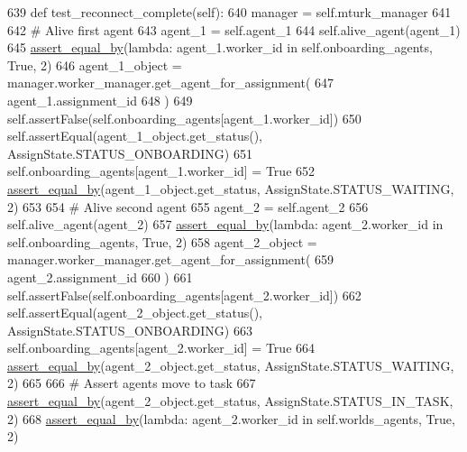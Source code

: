 \begin{DoxyCode}
639     \textcolor{keyword}{def }test\_reconnect\_complete(self):
640         manager = self.mturk\_manager
641 
642         \textcolor{comment}{# Alive first agent}
643         agent\_1 = self.agent\_1
644         self.alive\_agent(agent\_1)
645         \hyperlink{namespaceparlai_1_1mturk_1_1core_1_1test_1_1test__full__system_a0b463246d35658a2e422010f13dcf819}{assert\_equal\_by}(\textcolor{keyword}{lambda}: agent\_1.worker\_id \textcolor{keywordflow}{in} self.onboarding\_agents, \textcolor{keyword}{True}, 2)
646         agent\_1\_object = manager.worker\_manager.get\_agent\_for\_assignment(
647             agent\_1.assignment\_id
648         )
649         self.assertFalse(self.onboarding\_agents[agent\_1.worker\_id])
650         self.assertEqual(agent\_1\_object.get\_status(), AssignState.STATUS\_ONBOARDING)
651         self.onboarding\_agents[agent\_1.worker\_id] = \textcolor{keyword}{True}
652         \hyperlink{namespaceparlai_1_1mturk_1_1core_1_1test_1_1test__full__system_a0b463246d35658a2e422010f13dcf819}{assert\_equal\_by}(agent\_1\_object.get\_status, AssignState.STATUS\_WAITING, 2)
653 
654         \textcolor{comment}{# Alive second agent}
655         agent\_2 = self.agent\_2
656         self.alive\_agent(agent\_2)
657         \hyperlink{namespaceparlai_1_1mturk_1_1core_1_1test_1_1test__full__system_a0b463246d35658a2e422010f13dcf819}{assert\_equal\_by}(\textcolor{keyword}{lambda}: agent\_2.worker\_id \textcolor{keywordflow}{in} self.onboarding\_agents, \textcolor{keyword}{True}, 2)
658         agent\_2\_object = manager.worker\_manager.get\_agent\_for\_assignment(
659             agent\_2.assignment\_id
660         )
661         self.assertFalse(self.onboarding\_agents[agent\_2.worker\_id])
662         self.assertEqual(agent\_2\_object.get\_status(), AssignState.STATUS\_ONBOARDING)
663         self.onboarding\_agents[agent\_2.worker\_id] = \textcolor{keyword}{True}
664         \hyperlink{namespaceparlai_1_1mturk_1_1core_1_1test_1_1test__full__system_a0b463246d35658a2e422010f13dcf819}{assert\_equal\_by}(agent\_2\_object.get\_status, AssignState.STATUS\_WAITING, 2)
665 
666         \textcolor{comment}{# Assert agents move to task}
667         \hyperlink{namespaceparlai_1_1mturk_1_1core_1_1test_1_1test__full__system_a0b463246d35658a2e422010f13dcf819}{assert\_equal\_by}(agent\_2\_object.get\_status, AssignState.STATUS\_IN\_TASK, 2)
668         \hyperlink{namespaceparlai_1_1mturk_1_1core_1_1test_1_1test__full__system_a0b463246d35658a2e422010f13dcf819}{assert\_equal\_by}(\textcolor{keyword}{lambda}: agent\_2.worker\_id \textcolor{keywordflow}{in} self.worlds\_agents, \textcolor{keyword}{True}, 2)

\end{DoxyCode}
